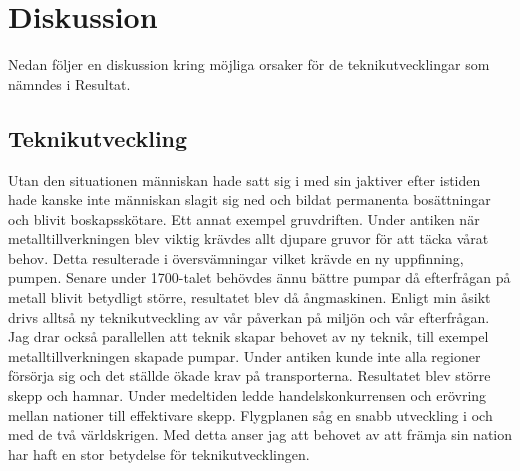 \section{Diskussion}
Nedan följer en diskussion kring möjliga orsaker för de teknikutvecklingar som nämndes i Resultat. 

\subsection{Teknikutveckling}
Utan den situationen människan hade satt sig i med sin jaktiver efter istiden hade kanske inte människan slagit sig ned och bildat permanenta bosättningar och blivit boskapsskötare. Ett annat exempel gruvdriften. Under antiken när metalltillverkningen blev viktig krävdes allt djupare gruvor för att täcka vårat behov. Detta resulterade i översvämningar vilket krävde en ny uppfinning, pumpen. Senare under 1700-talet behövdes ännu bättre pumpar då efterfrågan på metall blivit betydligt större, resultatet blev då ångmaskinen. Enligt min åsikt drivs alltså ny teknikutveckling av vår påverkan på miljön och vår efterfrågan. Jag drar också parallellen att teknik skapar behovet av ny teknik, till exempel metalltillverkningen skapade pumpar. 
\newline
\newline
Under antiken kunde inte alla regioner försörja sig och det ställde ökade krav på transporterna. Resultatet blev större skepp och hamnar. Under medeltiden ledde handelskonkurrensen och erövring mellan nationer till effektivare skepp. Flygplanen såg en snabb utveckling i och med de två världskrigen. Med detta anser jag att behovet av att främja sin nation har haft en stor betydelse för teknikutvecklingen. 
\newline
\newline

